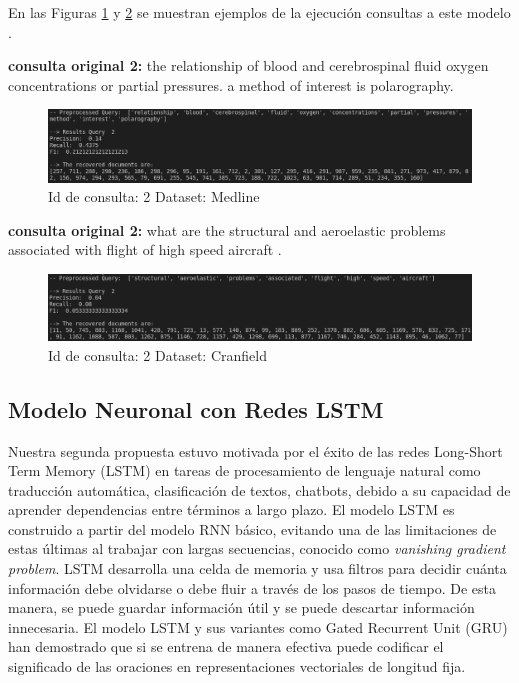 \documentclass{llncs}
\begin{document}
En las Figuras \ref{vect_q1} y \ref{vect_q4} se muestran ejemplos de la ejecución consultas a este modelo .

\textbf{consulta original 2: } the relationship of blood and cerebrospinal fluid oxygen concentrations
or partial pressures.  a method of interest is polarography.


\begin{figure}
	\begin{center}
		\includegraphics[width=\linewidth]{ ./images/v-med-q2.png}
		\caption{ Id de consulta: 2  Dataset: Medline }
		\label{vect_q1}
	\end{center}
\end{figure}


\textbf{consulta original 2: } what are the structural and aeroelastic problems associated with flight of high speed aircraft .

\begin{figure}
	\begin{center}
		\includegraphics[width=\linewidth]{ ./images/v-cran-q2.png}
		\caption{ Id de consulta: 2  Dataset: Cranfield }
		\label{vect_q4}
	\end{center}
\end{figure}


\subsection{Modelo Neuronal con Redes LSTM}

Nuestra segunda propuesta estuvo motivada por el éxito de las redes Long-Short Term Memory (LSTM) en tareas de procesamiento de lenguaje natural como traducción automática, clasificación de textos, chatbots, debido a su capacidad de aprender dependencias entre términos a largo plazo. El modelo LSTM es construido a partir del modelo RNN básico, evitando una de las limitaciones de estas últimas al trabajar con largas secuencias, conocido como \textit{vanishing gradient problem}. 
LSTM desarrolla una celda de memoria y usa filtros para decidir cuánta información debe olvidarse o debe fluir a través de los pasos de tiempo. De esta manera, se puede guardar información útil y se puede descartar información innecesaria. El modelo LSTM y sus variantes como Gated Recurrent Unit (GRU) han demostrado que si se entrena de manera efectiva puede codificar el significado de las oraciones en representaciones vectoriales de longitud fija. 
\end{document}
